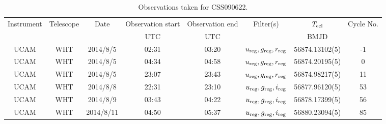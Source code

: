 \begin{table}
	\begin{center}
		\begin{tabular}{cccccccc}
			\hline
			Instrument & Telescope & Date & Observation start & Observation end & Filter(s) & $T_{\rm ecl}$ & Cycle No. \\
			 &  &  & UTC & UTC &  & BMJD &  \\
			\hline
			\hline
			UCAM & WHT & 2014/8/5  & 02:31 & 03:20 & $u_{\rm reg},g_{\rm reg},r_{\rm reg}$ & 56874.13102(5)                                                                                                            &                                          -1 \\
			UCAM & WHT & 2014/8/5  & 04:34 & 04:58 & $u_{\rm reg},g_{\rm reg},r_{\rm reg}$ & 56874.20195(5)                                                                                                            &                                           0 \\
			UCAM & WHT & 2014/8/5  & 23:07 & 23:43 & $u_{\rm reg},g_{\rm reg},r_{\rm reg}$ & 56874.98217(5)                                                                                                            &                                          11 \\
			UCAM & WHT & 2014/8/8  & 22:31 & 23:10 & $u_{\rm reg},g_{\rm reg},i_{\rm reg}$ & 56877.96120(5)                                                                                                            &                                          53 \\
			UCAM & WHT & 2014/8/9  & 03:43 & 04:22 & $u_{\rm reg},g_{\rm reg},i_{\rm reg}$ & 56878.17399(5)                                                                                                            &                                          56 \\
			UCAM & WHT & 2014/8/11 & 04:50 & 05:37 & $u_{\rm reg},g_{\rm reg},i_{\rm reg}$ & 56880.23094(5)                                                                                                            &                                          85 \\
		   \hline
		\end{tabular}
	\end{center}
	\caption{Observations taken for CSS090622.}
	\label{table:observing:observation logs CSS090622}
\end{table}